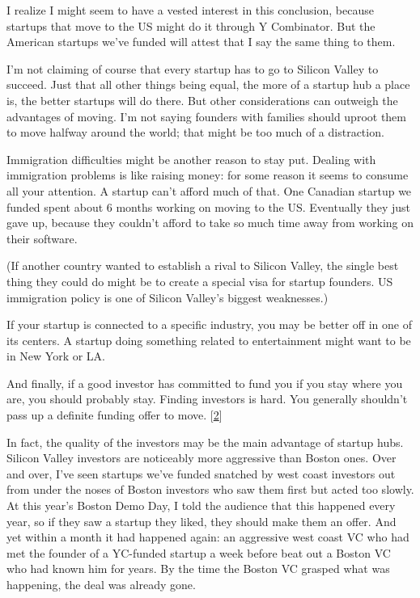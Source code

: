 I realize I might seem to have a vested interest in this conclusion,
because startups that move to the US might do it through Y Combinator.
But the American startups we've funded will attest that I say the same
thing to them.

I'm not claiming of course that every startup has to go to Silicon
Valley to succeed. Just that all other things being equal, the more of a
startup hub a place is, the better startups will do there. But other
considerations can outweigh the advantages of moving. I'm not saying
founders with families should uproot them to move halfway around the
world; that might be too much of a distraction.

Immigration difficulties might be another reason to stay put. Dealing
with immigration problems is like raising money: for some reason it
seems to consume all your attention. A startup can't afford much of
that. One Canadian startup we funded spent about 6 months working on
moving to the US. Eventually they just gave up, because they couldn't
afford to take so much time away from working on their software.

(If another country wanted to establish a rival to Silicon Valley, the
single best thing they could do might be to create a special visa for
startup founders. US immigration policy is one of Silicon Valley's
biggest weaknesses.)

If your startup is connected to a specific industry, you may be better
off in one of its centers. A startup doing something related to
entertainment might want to be in New York or LA.

And finally, if a good investor has committed to fund you if you stay
where you are, you should probably stay. Finding investors is hard. You
generally shouldn't pass up a definite funding offer to move.
{[}\hyperref[f2n]{2}{]}

In fact, the quality of the investors may be the main advantage of
startup hubs. Silicon Valley investors are noticeably more aggressive
than Boston ones. Over and over, I've seen startups we've funded
snatched by west coast investors out from under the noses of Boston
investors who saw them first but acted too slowly. At this year's Boston
Demo Day, I told the audience that this happened every year, so if they
saw a startup they liked, they should make them an offer. And yet within
a month it had happened again: an aggressive west coast VC who had met
the founder of a YC-funded startup a week before beat out a Boston VC
who had known him for years. By the time the Boston VC grasped what was
happening, the deal was already gone.


